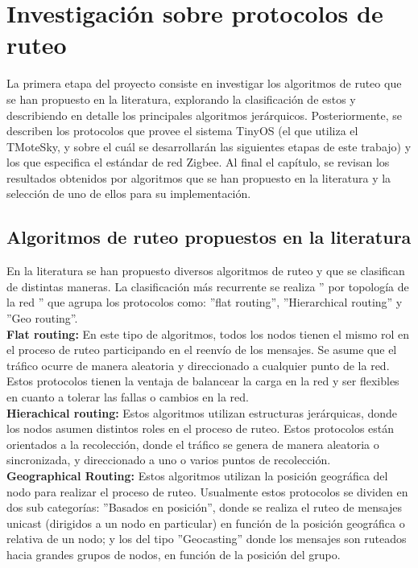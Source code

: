\chapter{Investigación sobre protocolos de ruteo}
La primera etapa del proyecto consiste en investigar los algoritmos de ruteo que se han propuesto en la literatura, explorando la clasificación de estos y describiendo en detalle los principales algoritmos jerárquicos. Posteriormente, se describen los protocolos que provee el sistema TinyOS (el que utiliza el TMoteSky, y sobre el cuál se desarrollarán las siguientes etapas de este trabajo) y los que especifica el estándar de red Zigbee. Al final el capítulo, se revisan los resultados obtenidos por algoritmos que se han propuesto en la literatura y la selección de uno de ellos para su implementación.

\section{Algoritmos de ruteo propuestos en la literatura}
En la literatura se han propuesto diversos algoritmos de ruteo y que se clasifican de distintas maneras. La clasificación más recurrente se realiza '' por topología de la red '' \cite{WSNSurvey} que agrupa los protocolos como: ''flat routing'', ''Hierarchical routing'' y ''Geo routing''.\\

\textbf{Flat routing:} En este tipo de algoritmos, todos los nodos tienen el mismo rol en el proceso de ruteo participando en el reenvío de los mensajes. Se asume que el tráfico ocurre de manera aleatoria y direccionado a cualquier punto de la red. Estos protocolos tienen la ventaja de balancear la carga en la red y ser flexibles en cuanto a tolerar las fallas o cambios en la red.\\

\textbf{Hierachical routing:} Estos algoritmos utilizan estructuras jerárquicas, donde los nodos asumen distintos roles en el proceso de ruteo. Estos protocolos están orientados a la recolección, donde el tráfico se genera de manera aleatoria o sincronizada, y direccionado a uno o varios puntos de recolección.\\

\textbf{Geographical Routing:} Estos algoritmos utilizan la posición geográfica del nodo para realizar el proceso de ruteo. Usualmente estos protocolos se dividen en dos sub categorías: ''Basados en posición'', donde se realiza el ruteo de mensajes unicast (dirigidos a un nodo en particular) en función de la posición geográfica o relativa de un nodo; y los del tipo ''Geocasting'' donde los mensajes son ruteados hacia grandes grupos de nodos, en función de la posición del grupo.\\

